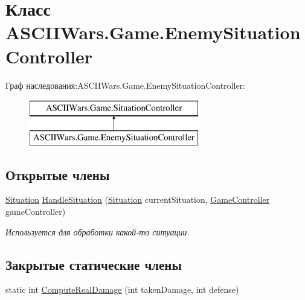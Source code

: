 \hypertarget{class_a_s_c_i_i_wars_1_1_game_1_1_enemy_situation_controller}{}\section{Класс A\+S\+C\+I\+I\+Wars.\+Game.\+Enemy\+Situation\+Controller}
\label{class_a_s_c_i_i_wars_1_1_game_1_1_enemy_situation_controller}
Граф наследования\+:A\+S\+C\+I\+I\+Wars.\+Game.\+Enemy\+Situation\+Controller\+:\begin{figure}[H]
\begin{center}
\leavevmode
\includegraphics[height=2.000000cm]{class_a_s_c_i_i_wars_1_1_game_1_1_enemy_situation_controller}
\end{center}
\end{figure}
\subsection*{Открытые члены}
\begin{DoxyCompactItemize}
\item 
\hyperlink{class_a_s_c_i_i_wars_1_1_game_1_1_situation}{Situation} \hyperlink{class_a_s_c_i_i_wars_1_1_game_1_1_enemy_situation_controller_a90db7af0d04e0ca4ee9231f63c0a6dd3}{Handle\+Situation} (\hyperlink{class_a_s_c_i_i_wars_1_1_game_1_1_situation}{Situation} current\+Situation, \hyperlink{class_a_s_c_i_i_wars_1_1_game_1_1_game_controller}{Game\+Controller} game\+Controller)
\begin{DoxyCompactList}\small\item\em Используется для обработки какой-\/то ситуации. \end{DoxyCompactList}\end{DoxyCompactItemize}
\subsection*{Закрытые статические члены}
\begin{DoxyCompactItemize}
\item 
static int \hyperlink{class_a_s_c_i_i_wars_1_1_game_1_1_enemy_situation_controller_afb7c1fe0420b219d35d8fbf892333e02}{Compute\+Real\+Damage} (int taken\+Damage, int defense)
\end{DoxyCompactItemize}


